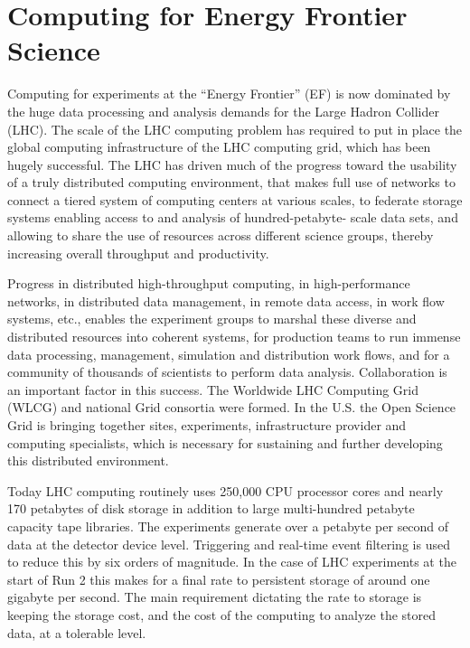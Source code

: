 
\section{Computing for Energy Frontier Science}

Computing for experiments at the ``Energy Frontier'' (EF) is now dominated by
the huge data processing and analysis demands for the Large Hadron Collider
(LHC). The scale of the LHC computing problem has required to put in place the
global computing infrastructure of the LHC computing grid, which has been
hugely successful.  The LHC has driven much of the progress toward the
usability of a truly distributed computing environment, that makes full use of
networks to connect a tiered system of computing centers at various scales, to
federate storage systems enabling access to and analysis of hundred-petabyte-
scale data sets, and allowing to share the use of resources across different
science groups, thereby increasing overall throughput and productivity.

Progress in distributed high-throughput computing, in high-performance
networks, in distributed data management, in remote data access, in work flow
systems, etc., enables the experiment groups to marshal these diverse and
distributed resources into coherent systems, for production teams to run
immense data processing, management, simulation and distribution work flows,
and for a community of thousands of scientists to perform data analysis.
Collaboration is an important factor in this success. The Worldwide LHC
Computing Grid (WLCG)  and national Grid consortia were formed. In the U.S.
the Open Science Grid is  bringing together sites, experiments, infrastructure
provider and computing specialists, which is necessary for  sustaining and
further developing this distributed environment.

Today LHC computing routinely uses 250,000 CPU processor cores and nearly 170
petabytes of disk storage in addition to large multi-hundred petabyte capacity
tape libraries.  The experiments generate over a petabyte per second of data
at the detector device level. Triggering and real-time event filtering  is
used to reduce this by six orders of magnitude. In the case of LHC experiments
at the start of Run 2 this makes for a final rate to persistent storage of
around one gigabyte per second. The main requirement dictating the rate to
storage is keeping the storage cost, and the  cost of the computing to analyze
the stored data, at a tolerable level.

